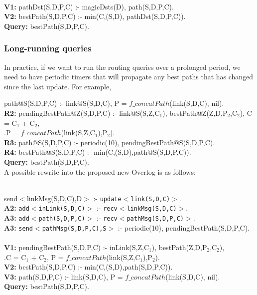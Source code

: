 \documentclass{article}
\newcommand{\code}[1]{{\tt \small #1}}
\newcommand{\datalogspace}{\textcolor[gray]{1}{.}\hspace{0.8in}}
\begin{document}
\\
{\bf V1: } pathDst(S,D,P,C) :- magicDsts(D), path(S,D,P,C). \\
{\bf V2: } bestPath(S,D,P,C) :- min(C,(S,D), pathDst(S,D,P,C)). \\
{\bf Query:} bestPath(S,D,P,C).\\


\subsubsection{Long-running queries}

In practice, if we want to run the routing queries over a prolonged
period, we need to have periodic timers that will propagate any best
paths that has changed since the last update. For example, 

 path@S(S,D,P,C) :- link@S(S,D,C), P = $f\_concatPath$(link(S,D,C), nil). \\
{\bf R2: } pendingBestPath@Z(S,D,P,C) :- link@S(S,Z,C$_{1}$), bestPath@Z(Z,D,P$_{2}$,C$_{2}$), C = C$_{1}$ + C$_{2}$,\\
\datalogspace P = $f\_concatPath$(link(S,Z,C$_{1}$),P$_{2}$).\\
{\bf R3: } path@S(S,D,P,C) :- periodic(10), pendingBestPath@S(S,D,P,C).\\
{\bf R4: } bestPath@S(S,D,P,C) :- min(C,(S,D),path@S(S,D,P,C)). \\
{\bf Query: } bestPath(S,D,P,C).\\

A possible rewrite into the proposed new Overlog is as follows:

\\
 send$<$linkMsg(S,D,C),D$>$ :- \code{update$<$link(S,D,C)$>$}.\\
{{\bf A2:} \code{add$<$inLink(S,D,C)$>$} :- \code{recv$<$linkMsg(S,D,C)$>$}.\\
{\bf A3:} \code{add$<$path(S,D,P,C)$>$} :- \code{recv$<$pathMsg(S,D,P,C)$>$}.\\
{\bf A3:} \code{send$<$pathMsg(S,D,P,C),S$>$} :- periodic(10), pendingBestPath(S,D,P,C).\\

\\
{\bf V1:} pendingBestPath(S,D,P,C) :- inLink(S,Z,C$_{1}$), bestPath(Z,D,P$_{2}$,C$_{2}$), \\
\datalogspace C = C$_{1}$ + C$_{2}$, P =
$f\_concatPath$(link(S,Z,C$_{1}$),P$_{2}$).\\
{\bf V2:} bestPath(S,D,P,C) :- min(C,(S,D),path(S,D,P,C)). \\
\bf V3:} path(S,D,P,C) :- link(S,D,C), P = $f\_concatPath$(link(S,D,C), nil). \\
{\bf Query: } bestPath(S,D,P,C).\\
\end{document}
